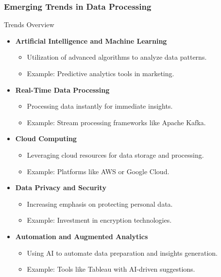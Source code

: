 \documentclass[aspectratio=169]{beamer}
\begin{document}
\begin{frame}[fragile]
    \frametitle{Emerging Trends in Data Processing}
    \begin{block}{Trends Overview}
        \begin{itemize}
            \item \textbf{Artificial Intelligence and Machine Learning}
            \begin{itemize}
                \item Utilization of advanced algorithms to analyze data patterns.
                \item Example: Predictive analytics tools in marketing.
            \end{itemize}

            \item \textbf{Real-Time Data Processing}
            \begin{itemize}
                \item Processing data instantly for immediate insights.
                \item Example: Stream processing frameworks like Apache Kafka.
            \end{itemize}

            \item \textbf{Cloud Computing}
            \begin{itemize}
                \item Leveraging cloud resources for data storage and processing.
                \item Example: Platforms like AWS or Google Cloud.
            \end{itemize}
            
            \item \textbf{Data Privacy and Security}
            \begin{itemize}
                \item Increasing emphasis on protecting personal data.
                \item Example: Investment in encryption technologies.
            \end{itemize}

            \item \textbf{Automation and Augmented Analytics}
            \begin{itemize}
                \item Using AI to automate data preparation and insights generation.
                \item Example: Tools like Tableau with AI-driven suggestions.
            \end{itemize}
        \end{itemize}
    \end{block}
\end{frame}
\end{document}
